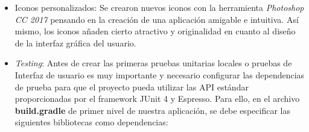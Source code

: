 \begin{itemize}
	\item Iconos personalizados: Se crearon nuevos iconos con la herramienta \textit{Photoshop CC 2017} pensando en la creación de una aplicación amigable e intuitiva. Así mismo, los iconos añaden cierto atractivo y originalidad en cuanto al diseño de la interfaz gráfica del usuario.
	\item \textit{Testing}: Antes de crear las primeras pruebas unitarias locales o pruebas de Interfaz de usuario es muy importante y necesario configurar las dependencias de prueba para que el proyecto pueda utilizar las API estándar proporcionadas por el framework JUnit 4 y Espresso. Para ello, en el archivo \textbf{build.gradle} de primer nivel de nuestra aplicación, se debe especificar las siguientes bibliotecas como dependencias:
	
\end{itemize}
	
